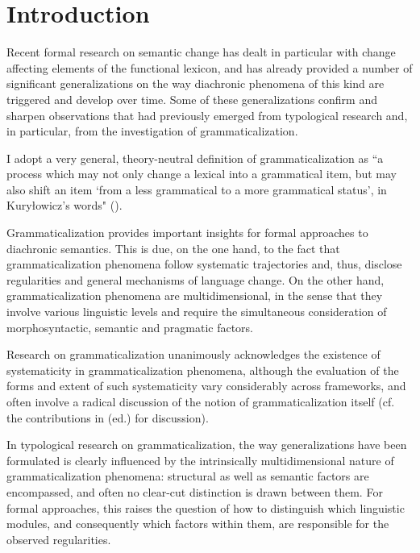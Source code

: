 \documentclass[output=paper,modfonts,nonflat,citecolor=brown,
showindex
]{langsci/langscibook}
\author{Chiara Gianollo\affiliation{Università di Bologna}}
\begin{document}
\maketitle
\section{Introduction}

Recent formal research on semantic change has dealt in particular with change affecting elements of the functional lexicon, and has already provided a number of significant generalizations on the way diachronic phenomena of this kind are triggered and develop over time. Some of these generalizations confirm and sharpen observations that had previously emerged from typological research and, in particular, from the investigation of grammaticalization.

I adopt a very general, theory-neutral definition of grammaticalization as ``a process which may not only change a lexical into a grammatical item, but may also shift an item `from a less grammatical to a more grammatical status', in Kury\l{}owicz's words" (\citealt[13]{Lehmann15}).

Grammaticalization provides important insights for formal approaches to diachronic semantics. This is due, on the one hand, to the fact that grammaticalization phenomena follow systematic trajectories and, thus, disclose regularities and general mechanisms of language change. On the other hand, grammaticalization phenomena are multidimensional, in the sense that they involve various linguistic levels and require the simultaneous consideration of morphosyntactic, semantic and pragmatic factors.

Research on grammaticalization unanimously acknowledges the existence of systematicity in grammaticalization phenomena, although the evaluation of the forms and extent of such systematicity vary considerably across frameworks, and often involve a radical discussion of the notion of grammaticalization itself (cf. the contributions in \citealt{Campbell01} (ed.) for discussion).

In typological research on grammaticalization, the way generalizations have been formulated is clearly influenced by the intrinsically multidimensional nature of grammaticalization phenomena: structural as well as semantic factors are encompassed, and often no clear-cut distinction is drawn between them. For formal approaches, this raises the question of how to distinguish which linguistic modules, and consequently which factors within them, are responsible for the observed regularities.
\end{document}
